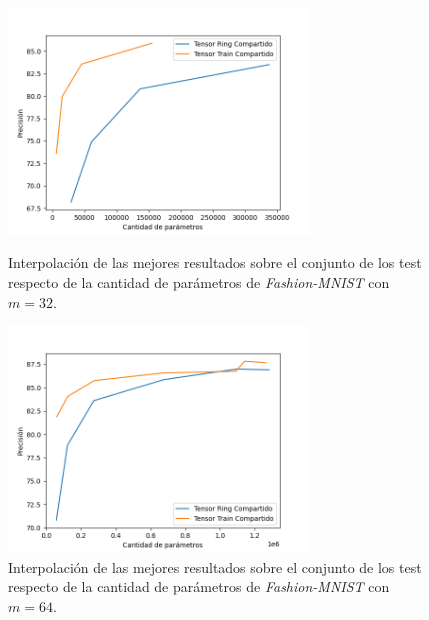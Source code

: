 \documentclass[spanish]{article}
\theoremstyle{definition}
\theoremstyle{remark}
\numberwithin{equation}{section}
\numberwithin{equation}{section} %
\begin{document}
\begin{figure}[H]
   \begin{minipage}{0.48\textwidth}
     \centering
     \captionsetup{justification=centering}
     \includegraphics[trim={0.8cm 0 1cm 1cm},clip,width=8cm]{img/FASHION_MNIST/Fashion_interpolate_best_run_m=32.png}
     \caption{Interpolación de las mejores resultados  sobre el conjunto de los test respecto de la cantidad de parámetros de \textit{Fashion-MNIST} con $m=32$.}\label{Fig:Fashion_interpolate_best_run_m=32}
   \end{minipage}\hfill
   \begin{minipage}{0.48\textwidth}
     \centering
          \captionsetup{justification=centering}

     \includegraphics[trim={0.8cm 0 1cm 1cm},clip,width=8cm]{img/FASHION_MNIST/Fashion_interpolate_best_run_m=64.png}
     \caption{Interpolación de las mejores resultados  sobre el conjunto de los test respecto de la cantidad de parámetros de \textit{Fashion-MNIST} con $m=64$.}\label{Fig:Fashion_interpolate_best_run_m=64}
   \end{minipage}
\end{figure}
\end{document}
